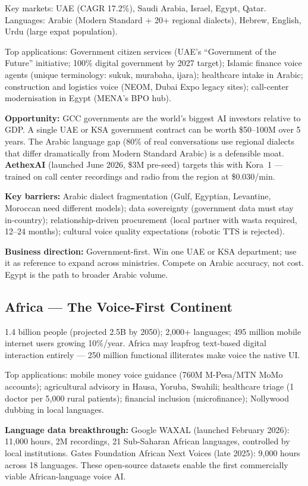 \documentclass[12pt,a4paper]{article}
\begin{document}
Key markets: UAE (CAGR 17.2\%), Saudi Arabia, Israel, Egypt, Qatar.
Languages: Arabic (Modern Standard + 20+ regional dialects), Hebrew, English,
Urdu (large expat population).

Top applications: Government citizen services (UAE's ``Government of the
Future'' initiative; 100\% digital government by 2027 target); Islamic finance
voice agents (unique terminology: sukuk, murabaha, ijara); healthcare intake in
Arabic; construction and logistics voice (NEOM, Dubai Expo legacy sites);
call-center modernisation in Egypt (MENA's BPO hub).

\textbf{Opportunity:} GCC governments are the world's biggest AI investors
relative to GDP.  A single UAE or KSA government contract can be worth
\$50--100M over 5 years.  The Arabic language gap (80\% of real conversations
use regional dialects that differ dramatically from Modern Standard Arabic)
is a defensible moat.  \textbf{AethexAI} (launched June 2026, \$3M
pre-seed) targets this with Kora~1 --- trained on call center recordings
and radio from the region at \$0.030/min.

\textbf{Key barriers:} Arabic dialect fragmentation (Gulf, Egyptian,
Levantine, Moroccan need different models); data sovereignty (government data
must stay in-country); relationship-driven procurement (local partner with
wasta required, 12--24 months); cultural voice quality expectations (robotic
TTS is rejected).

\textbf{Business direction:} Government-first.  Win one UAE or KSA
department; use it as reference to expand across ministries.  Compete on
Arabic accuracy, not cost.  Egypt is the path to broader Arabic volume.

\subsection{Africa --- The Voice-First Continent}

1.4 billion people (projected 2.5B by 2050); 2{,}000+ languages; 495 million
mobile internet users growing 10\%/year.  Africa may leapfrog text-based
digital interaction entirely --- 250 million functional illiterates make voice
the native UI.

Top applications: mobile money voice guidance (760M M-Pesa/MTN MoMo
accounts); agricultural advisory in Hausa, Yoruba, Swahili; healthcare
triage (1 doctor per 5{,}000 rural patients); financial inclusion
(microfinance); Nollywood dubbing in local languages.

\textbf{Language data breakthrough:} Google WAXAL (launched February 2026):
11{,}000 hours, 2M recordings, 21 Sub-Saharan African languages, controlled
by local institutions.  Gates Foundation African Next Voices (late 2025):
9{,}000 hours across 18 languages.  These open-source datasets enable the
first commercially viable African-language voice AI.
\end{document}

